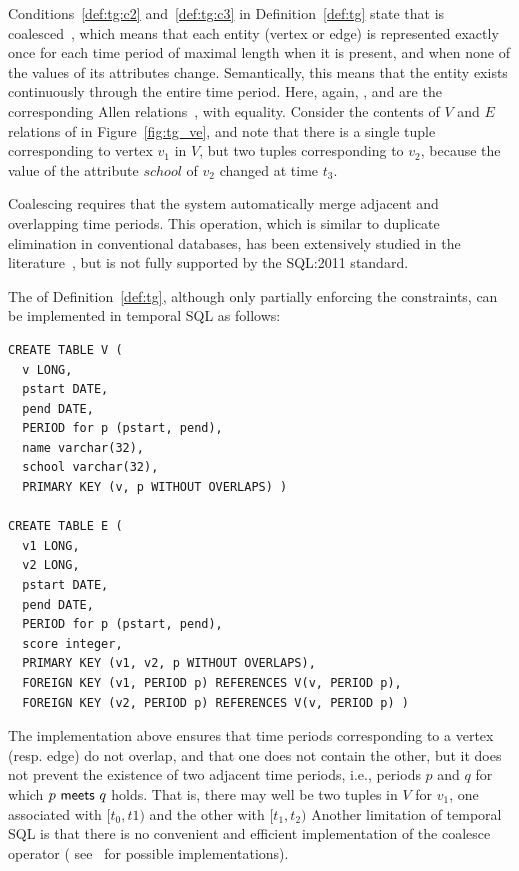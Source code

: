Conditions~\ref{def:tg:c2} and~\ref{def:tg:c3} in
Definition~\ref{def:tg} state that \tg is
coalesced~\cite{DBLP:conf/vldb/BohlenSS96}, which means that each
entity (vertex or edge) is represented exactly once for each time
period of maximal length when it is present, and when none of the
values of its attributes change.  Semantically, this means that the
entity exists continuously through the entire time period.  Here,
again, ,  and 
are the corresponding Allen relations~\cite{allen83}, with
equality. Consider the contents of $V$ and $E$ relations of 
in Figure~\ref{fig:tg_ve}, and note that there is a single tuple
corresponding to vertex $v_1$ in $V$, but two tuples corresponding to
$v_2$, because the value of the attribute $school$ of $v_2$ changed at
time $t_3$.

Coalescing requires that the system automatically merge adjacent and
overlapping time periods.  This operation, which is similar to
duplicate elimination in conventional databases, has been extensively
studied in the
literature~\cite{DBLP:conf/vldb/BohlenSS96,DBLP:journals/sigmod/Zimanyi06},
but is not fully supported by the SQL:2011 standard.

The \tg of Definition~\ref{def:tg}, although only partially enforcing
the constraints, can be implemented in temporal SQL as follows:

\begin{small}
\begin{verbatim}
CREATE TABLE V (
  v LONG,
  pstart DATE,
  pend DATE,
  PERIOD for p (pstart, pend),
  name varchar(32),
  school varchar(32),
  PRIMARY KEY (v, p WITHOUT OVERLAPS) )

CREATE TABLE E (
  v1 LONG,
  v2 LONG,
  pstart DATE,
  pend DATE,
  PERIOD for p (pstart, pend),
  score integer,
  PRIMARY KEY (v1, v2, p WITHOUT OVERLAPS),
  FOREIGN KEY (v1, PERIOD p) REFERENCES V(v, PERIOD p),
  FOREIGN KEY (v2, PERIOD p) REFERENCES V(v, PERIOD p) )
\end{verbatim}
\end{small}

The implementation above ensures that time periods corresponding to a
vertex (resp. edge) do not overlap, and that one does not contain the
other, but it does not prevent the existence of two adjacent time
periods, i.e., periods $p$ and $q$ for which $p~\mathsf{meets}~q$
holds.  That is, there may well be two tuples in $V$ for $v_1$, one
associated with $[t_0,t1)$ and the other with $[t_1,t_2)$ Another
    limitation of temporal SQL is that there is no convenient and
    efficient implementation of the coalesce operator (
    see~\cite{DBLP:reference/db/Bohlen09} for possible implementations).

